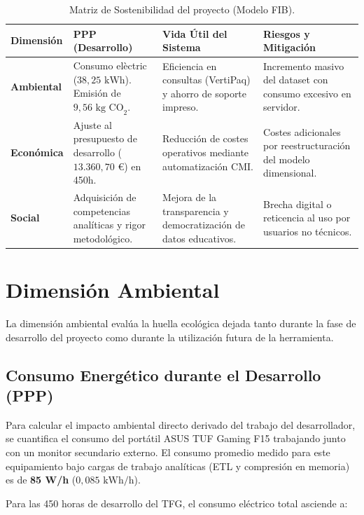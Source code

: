 \documentclass[12pt, a4paper, twoside]{report}
\begin{document}
\begin{table}[H]
\centering
\caption{Matriz de Sostenibilidad del proyecto (Modelo FIB).}
\label{tab:matriz_sostenibilidad}
\small
\renewcommand{\arraystretch}{0.85}
\setlength{\tabcolsep}{3pt}
\begin{tabularx}{\textwidth}{@{} p{2.0cm} X X X @{}}
\toprule
\textbf{Dimensión} & \textbf{PPP (Desarrollo)} & \textbf{Vida Útil del Sistema} & \textbf{Riesgos y Mitigación} \\ \midrule
\textbf{Ambiental} & Consumo elèctric ($38,25 \text{ kWh}$). Emisión de $9,56 \text{ kg CO}_2$. & Eficiencia en consultas (VertiPaq) y ahorro de soporte impreso. & Incremento masivo del dataset con consumo excesivo en servidor. \\ \addlinespace[2pt]
\textbf{Económica} & Ajuste al presupuesto de desarrollo ($13.360,70 \text{ €}$) en 450h. & Reducción de costes operativos mediante automatización CMI. & Costes adicionales por reestructuración del modelo dimensional. \\ \addlinespace[2pt]
\textbf{Social} & Adquisición de competencias analíticas y rigor metodológico. & Mejora de la transparencia y democratización de datos educativos. & Brecha digital o reticencia al uso por usuarios no técnicos. \\ \bottomrule
\end{tabularx}
\end{table}

\section{Dimensión Ambiental}
La dimensión ambiental evalúa la huella ecológica dejada tanto durante la fase de desarrollo del proyecto como durante la utilización futura de la herramienta.

\subsection{Consumo Energético durante el Desarrollo (PPP)}
Para calcular el impacto ambiental directo derivado del trabajo del desarrollador, se cuantifica el consumo del portátil ASUS TUF Gaming F15 trabajando junto con un monitor secundario externo. El consumo promedio medido para este equipamiento bajo cargas de trabajo analíticas (ETL y compresión en memoria) es de \textbf{85 W/h} ($0,085 \text{ kWh/h}$).

Para las 450 horas de desarrollo del TFG, el consumo eléctrico total asciende a:
\end{document}
